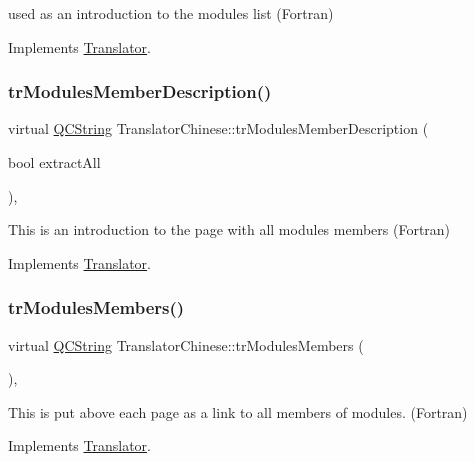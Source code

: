 used as an introduction to the modules list (Fortran) 

Implements \mbox{\hyperlink{class_translator}{Translator}}.

\mbox{\label{class_translator_chinese_aa11d57b205557658c5ab3851b28590d8}} 
\subsubsection{\texorpdfstring{trModulesMemberDescription()}{trModulesMemberDescription()}}
{\footnotesize\ttfamily virtual \mbox{\hyperlink{class_q_c_string}{Q\+C\+String}} Translator\+Chinese\+::tr\+Modules\+Member\+Description (\begin{DoxyParamCaption}\item[{bool}]{extract\+All }\end{DoxyParamCaption})\hspace{0.3cm}{\ttfamily [inline]}, {\ttfamily [virtual]}}

This is an introduction to the page with all modules members (Fortran) 

Implements \mbox{\hyperlink{class_translator}{Translator}}.

\mbox{\label{class_translator_chinese_acef3e40d4f7cdc93177e46a5051e4dac}} 
\subsubsection{\texorpdfstring{trModulesMembers()}{trModulesMembers()}}
{\footnotesize\ttfamily virtual \mbox{\hyperlink{class_q_c_string}{Q\+C\+String}} Translator\+Chinese\+::tr\+Modules\+Members (\begin{DoxyParamCaption}{ }\end{DoxyParamCaption})\hspace{0.3cm}{\ttfamily [inline]}, {\ttfamily [virtual]}}

This is put above each page as a link to all members of modules. (Fortran) 

Implements \mbox{\hyperlink{class_translator}{Translator}}.

